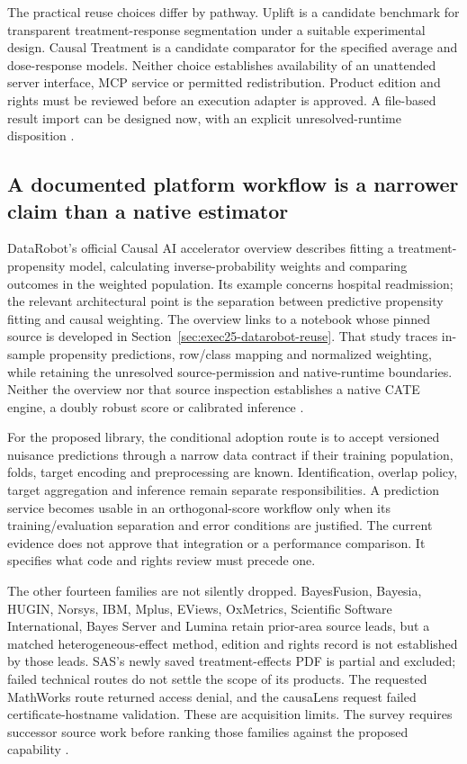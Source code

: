 The practical reuse choices differ by pathway. Uplift is a candidate
benchmark for transparent treatment-response segmentation under a suitable
experimental design. Causal Treatment is a candidate comparator for the
specified average and dose-response models. Neither choice establishes
availability of an unattended server interface, MCP service or permitted
redistribution. Product edition and rights must be reviewed before an
execution adapter is approved. A file-based result import can be designed
now, with an explicit unresolved-runtime disposition
\citep{exec13_ch_scope}.

\subsection{A documented platform workflow is a narrower claim than a native estimator}

DataRobot's official Causal AI accelerator overview describes fitting a
treatment-propensity model, calculating inverse-probability weights and
comparing outcomes in the weighted population. Its example concerns
hospital readmission; the relevant architectural point is the separation
between predictive propensity fitting and causal weighting. The overview links to a notebook whose pinned source is developed in
Section~\ref{sec:exec25-datarobot-reuse}. That study traces in-sample propensity
predictions, row/class mapping and normalized weighting, while retaining the
unresolved source-permission and native-runtime boundaries. Neither the
overview nor that source inspection establishes a native CATE engine, a
doubly robust score or calibrated inference
\citep{exec13_ch_datarobot}.

For the proposed library, the conditional adoption route is to accept
versioned nuisance predictions through a narrow data contract if their
training population, folds, target encoding and preprocessing are known.
Identification, overlap policy, target aggregation and inference remain
separate responsibilities. A prediction service becomes usable in an
orthogonal-score workflow only when its training/evaluation separation
and error conditions are justified. The current evidence does not approve
that integration or a performance comparison. It specifies what code and
rights review must precede one.

The other fourteen families are not silently dropped. BayesFusion, Bayesia,
HUGIN, Norsys, IBM, Mplus, EViews, OxMetrics, Scientific Software
International, Bayes Server and Lumina retain prior-area source leads,
but a matched heterogeneous-effect method, edition and rights record is
not established by those leads. SAS's newly saved treatment-effects PDF
is partial and excluded; failed technical routes do not settle the scope
of its products. The requested MathWorks route returned access denial,
and the causaLens request failed certificate-hostname validation. These
are acquisition limits. The survey requires successor source work before
ranking those families against the proposed capability
\citep{exec13_ch_scope}.

